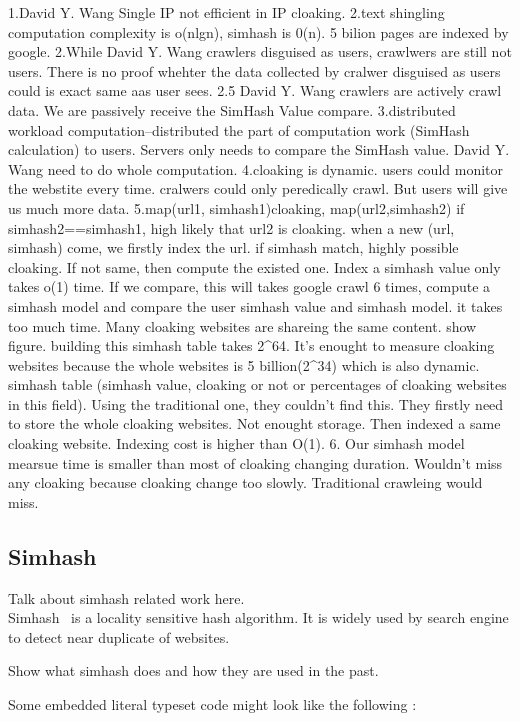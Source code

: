 1.David Y. Wang Single IP not efficient in  IP cloaking.
2.text shingling computation complexity is o(nlgn), simhash is 0(n). 5 bilion pages are indexed by google. 
2.While David Y. Wang crawlers disguised as users, crawlwers are still not users. There is no proof whehter the data collected by cralwer disguised as users could is exact same aas user sees. 
2.5 David Y. Wang crawlers are actively crawl data. We are passively receive the SimHash Value compare. 
3.distributed workload computation--distributed the part of computation work (SimHash calculation) to users. Servers only needs to compare the SimHash value. David Y. Wang need to do whole computation. 
4.cloaking is dynamic. users could monitor the webstite every time. cralwers could only peredically crawl. But users will give us much more data.
5.map(url1, simhash1)cloaking,  map(url2,simhash2) if simhash2==simhash1, high likely that url2 is cloaking. when a new (url, simhash) come, we firstly index the url. if simhash match, highly possible
cloaking. If not same, then compute the existed one. Index a simhash value only takes o(1) time. If we compare, this will takes google crawl 6 times, compute a simhash model and compare the user 
simhash value and simhash model. it takes too much time. Many cloaking websites are shareing the same content. show figure. \XXX{} building this simhash table takes 2^64. It's enought to measure 
cloaking websites because the whole websites is 5 billion(2^34) which is also dynamic. simhash table (simhash value, cloaking or not or percentages of cloaking websites in this field). Using the traditional one, they couldn't find this. They firstly need to store the whole cloaking websites. Not enought storage. Then indexed a same cloaking website. Indexing cost is higher than O(1). 
6. Our simhash model mearsue time is smaller than most of cloaking changing duration. Wouldn't miss any cloaking because cloaking change too slowly. Traditional crawleing would miss. 
\subsection{Simhash}
Talk about simhash related work here. \\
Simhash~\cite{charikar2002similarity}  is a locality sensitive hash algorithm.
It is widely used by search engine to detect near duplicate of websites.


Show what simhash does and how they are used in the past.

Some embedded literal typeset code might 
look like the following :

